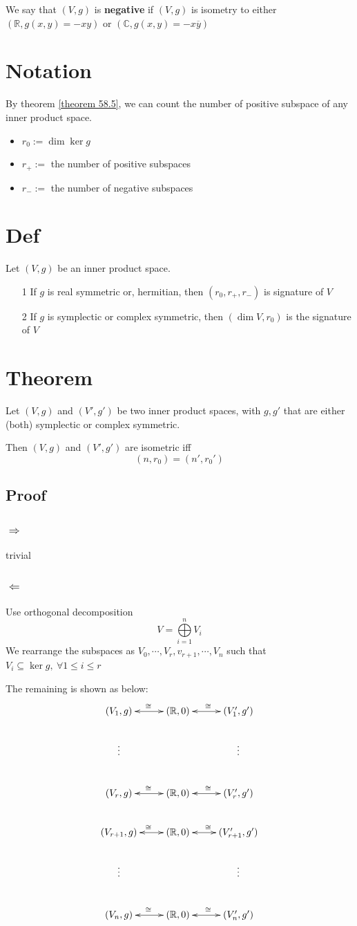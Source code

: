 \documentclass{book}
\begin{document}
We say that $(V,g)$ is \textbf{negative} if $(V,g)$ is isometry to either $(\mathbb{R},g(x,y)=-xy)$ or $(\mathbb{C},g(x,y)=-x\overline{y})$
\section{Notation}
By theorem \ref{theorem 58.5}, we can count the number of positive subspace of any inner product space.
\begin{itemize}
    \item $r_0:=\dim\ker g$
    \item $r_+:=$ the number of positive subspaces
    \item $r_-:=$ the number of negative subspaces
\end{itemize}
\section{Def}
Let $(V,g)$ be an inner product space.
\begin{itemize}
    \item [1]If $g$ is real symmetric or, hermitian, then $(r_0,r_+,r_-)$ is signature of $V$
    \item [2]If $g$ is symplectic or complex symmetric, then $(\dim V,r_0)$ is the signature of $V$
\end{itemize}
\section{Theorem}
Let $(V,g)$ and $(V',g')$ be two inner product spaces, with $g,g'$ that are either (both) symplectic or complex symmetric.

Then $(V,g)$ and $(V',g')$ are isometric iff$$(n,r_0)=(n',r_0')$$
\subsection*{Proof}
\subsubsection{$\Rightarrow$}trivial
\subsubsection{$\Leftarrow$}
Use orthogonal decomposition
$$V=\bigoplus\limits_{i=1}^nV_i$$
We rearrange the subspaces as $V_0,\cdots,V_r,v_{r+1},\cdots,V_n$ such that $V_i\subseteq\ker g,\ \forall 1\leq i\leq r$

The remaining is shown as below:
$$\xymatrix{
    (V_1,g)\ar@{<->}[r]^\cong&(\mathbb{R},0)\ar@{<->}[r]^\cong&(V'_1,g')\\
    \vdots&&\vdots\\
    (V_r,g)\ar@{<->}[r]^\cong&(\mathbb{R},0)\ar@{<->}[r]^\cong&(V'_r,g')\\
    (V_{r+1},g)\ar@{<->}[r]^\cong&(\mathbb{R},0)\ar@{<->}[r]^\cong&(V'_{r+1},g')\\
    \vdots&&\vdots\\
    (V_n,g)\ar@{<->}[r]^\cong&(\mathbb{R},0)\ar@{<->}[r]^\cong&(V'_n,g')
}$$
\end{document}
